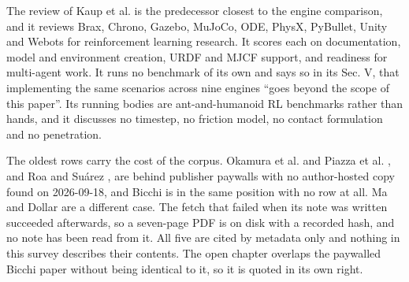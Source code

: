 The review of Kaup et al. \cite{nine_physics_engines_review_2024} is the predecessor closest to the
engine comparison, and it
reviews Brax, Chrono, Gazebo, MuJoCo, ODE, PhysX, PyBullet, Unity and Webots for reinforcement
learning research. It scores each on documentation, model and environment creation, URDF and MJCF
support, and readiness for multi-agent work. It runs no benchmark of its own and says so in its
Sec. V, that implementing the same scenarios across nine engines ``goes beyond the scope of this
paper''. Its running bodies are ant-and-humanoid RL benchmarks rather than hands, and it discusses
no timestep, no friction model, no contact formulation and no penetration.


The oldest rows carry the cost of the corpus. Okamura et al. and Piazza et al.
\cite{okamura_overview_2000,piazza_century_2019}, and Roa and Su\'arez
\cite{roa_suarez_grasp_quality_2015}, are behind publisher paywalls with no author-hosted copy found
on 2026-09-18, and Bicchi \cite{bicchi_hands_2000} is in the same position with no row at all. Ma
and Dollar \cite{ma_dollar_dexterity_2011} are a different case. The fetch that failed when its note
was written
succeeded afterwards, so a seven-page PDF is on disk with a recorded hash, and no note has been
read from it. All five are cited by metadata only and nothing in this survey describes their
contents. The open chapter \cite{bicchi_grasping_chapter_2001} overlaps the paywalled Bicchi paper
without being identical to it, so it is quoted in its own right.






